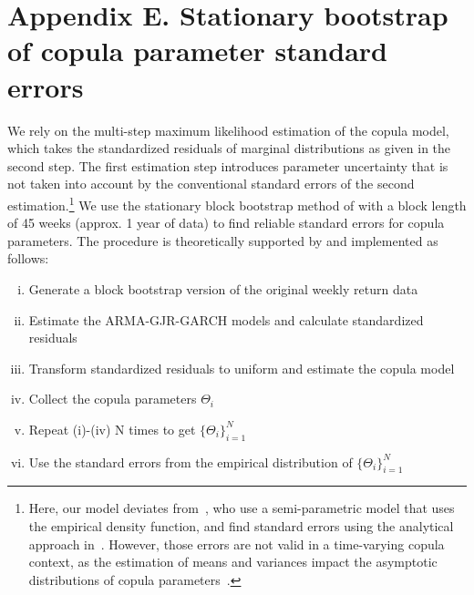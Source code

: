 \section{Appendix E. Stationary bootstrap of copula parameter standard errors} \label{App:Appendix_bootstrap}
We rely on the multi-step maximum likelihood estimation of the copula model, which takes the standardized residuals of marginal distributions as given in the second step. The first estimation step introduces parameter uncertainty that is not taken into account by the conventional standard errors of the second estimation.\footnote{Here, our model deviates from~\textcite{ChristoffersenLanglois2013}, who use a semi-parametric model that uses the empirical density function, and find standard errors using the analytical approach in~\textcite{ChenFan2006}. However, those errors are not valid in a time-varying copula context, as the estimation of means and variances impact the asymptotic distributions of copula parameters~\autocite{Remillard2010}.} We use the stationary block bootstrap method of \textcite{PolitisRomano1994} with a block length of 45 weeks (approx. 1 year of data) to find reliable standard errors for copula parameters. The procedure is theoretically supported by \textcite{GonclavesWhite2004} and implemented as follows:
\begin{enumerate}[(i)]
    \item Generate a block bootstrap version of the original weekly return data
    \item Estimate the ARMA-GJR-GARCH models and calculate standardized residuals
    \item Transform standardized residuals to uniform and estimate the copula model
    \item Collect the copula parameters $\Theta_i$
    \item Repeat (i)-(iv) N times to get $\{\Theta_i\}^{N}_{i=1}$
    \item Use the standard errors from the empirical distribution of $\{\Theta_i\}^{N}_{i=1}$
\end{enumerate}

